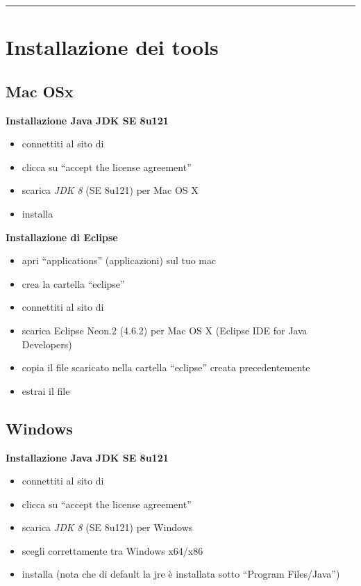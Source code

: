 \documentclass{article}
\begin{document}
\hrule
\section{Installazione dei tools}
\subsection{Mac OSx}


\textbf{Installazione Java JDK SE 8u121}
\begin{itemize}
\item connettiti al sito di
  \href{http://www.oracle.com/technetwork/java/javase/downloads/jdk8-downloads-2133151.html}{}
\item clicca su ``accept the license agreement''
\item scarica \textit{JDK 8} (SE 8u121) per Mac OS X
\item installa
\end{itemize}


\textbf{Installazione di Eclipse}
\begin{itemize}
\item apri ``applications'' (applicazioni) sul tuo mac
\item crea la cartella ``eclipse''
\item connettiti al sito di \href{https://eclipse.org/downloads/}{}
\item scarica Eclipse Neon.2 (4.6.2) per Mac OS X (Eclipse IDE for Java Developers)
\item copia il file scaricato nella cartella ``eclipse'' creata precedentemente
\item estrai il file
\end{itemize}


\subsection{Windows}
\textbf{Installazione Java JDK SE 8u121}
\begin{itemize}
\item connettiti al sito di
  \href{http://www.oracle.com/technetwork/java/javase/downloads/jdk8-downloads-2133151.html}{}
\item clicca su ``accept the license agreement''
\item scarica \textit{JDK 8} (SE 8u121) per Windows 
\item scegli correttamente tra Windows x64/x86
\item installa (nota che di default la jre \`e installata sotto ``Program Files/Java'')
\end{itemize}
\end{document}
